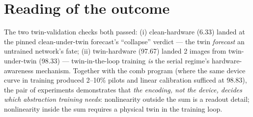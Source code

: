 \documentclass[11pt]{article}
\begin{document}
\section{Reading of the outcome}
The two twin-validation checks both passed: (i) clean-hardware
(6.33) landed at the pinned clean-under-twin forecast's
``collapse'' verdict --- the twin \emph{forecast} an untrained
network's fate; (ii) twin-hardware (97.67) landed 2 images from
twin-under-twin (98.33) --- twin-in-the-loop training \emph{is} the
serial regime's hardware-awareness mechanism. Together with the comb
program (where the same device curve in training produced 2--10\%
pilots and linear calibration sufficed at 98.83), the pair of
experiments demonstrates that \emph{the encoding, not the device,
decides which abstraction training needs}: nonlinearity outside the
sum is a readout detail; nonlinearity inside the sum requires a
physical twin in the training loop.
\end{document}
